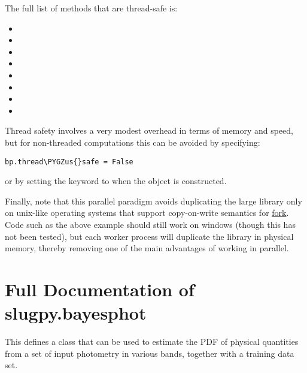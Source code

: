 \documentclass[letterpaper,10pt,english]{sphinxmanual}
\def\PYGZus{\char`\_}
\begin{document}
The full list of  methods that are thread-safe is:
\begin{itemize}
\item {} 

\item {} 

\item {} 

\item {} 

\item {} 

\item {} 

\item {} 

\item {} 

\end{itemize}

Thread safety involves a very modest overhead in terms of memory and speed, but for non-threaded computations this can be avoided by specifying:

\begin{Verbatim}[commandchars=\\\{\}]
bp.thread\PYGZus{}safe = False
\end{Verbatim}

or by setting the  keyword to  when the 
object is constructed.

Finally, note that this parallel paradigm avoids duplicating the large
library only on unix-like operating systems that support copy-on-write
semantics for \href{https://en.wikipedia.org/wiki/Fork\_(system\_call)}{fork}. Code such as the
above example should still work on windows (though this has not been
tested), but each worker process will duplicate the library in
physical memory, thereby removing one of the main advantages of
working in parallel.


\section{Full Documentation of slugpy.bayesphot}
\label{bayesphot:module-slugpy.bayesphot.bp}\label{bayesphot:ssec-slugpy-bayesphot}\label{bayesphot:full-documentation-of-slugpy-bayesphot}
This defines a class that can be used to estimate the PDF of physical
quantities from a set of input photometry in various bands, together
with a training data set.
\end{document}
